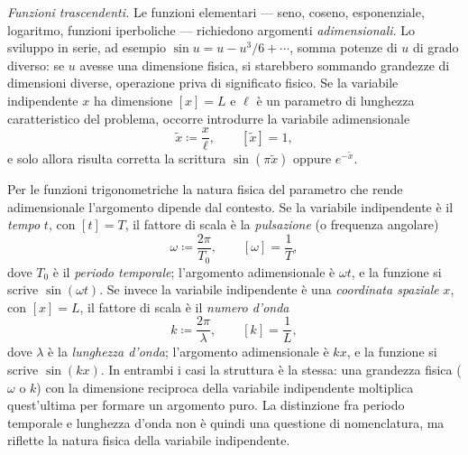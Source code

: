 \textit{Funzioni trascendenti.}
Le funzioni elementari --- seno, coseno, esponenziale, logaritmo, funzioni
iperboliche --- richiedono argomenti \emph{adimensionali}. Lo sviluppo in
serie, ad esempio $\sin u = u - u^3/6 + \cdots$, somma potenze di $u$ di
grado diverso: se $u$ avesse una dimensione fisica, si starebbero sommando
grandezze di dimensioni diverse, operazione priva di significato fisico.
Se la variabile indipendente $x$ ha dimensione $[x] = L$ e $\ell$
è un parametro di lunghezza caratteristico del problema, occorre introdurre
la variabile adimensionale
\begin{equation}
	\tilde{x} \coloneqq \frac{x}{\ell}, \qquad [\tilde{x}] = 1,
\end{equation}
e solo allora risulta corretta la scrittura $\sin(\pi\tilde{x})$ oppure
$e^{-\tilde{x}}$.

Per le funzioni trigonometriche la natura fisica del parametro che rende
adimensionale l'argomento dipende dal contesto. Se la variabile
indipendente è il \emph{tempo} $t$, con $[t] = T$, il fattore
di scala è la \emph{pulsazione} (o frequenza angolare)
\begin{equation}
	\omega \coloneqq \frac{2\pi}{T_0}, \qquad [\omega] = \frac{1}{T},
\end{equation}
dove $T_0$ è il \emph{periodo temporale}; l'argomento adimensionale è
$\omega t$, e la funzione si scrive $\sin(\omega t)$.
Se invece la variabile indipendente è una \emph{coordinata spaziale} $x$,
con $[x] = L$, il fattore di scala è il \emph{numero d'onda}
\begin{equation}
	k \coloneqq \frac{2\pi}{\lambda}, \qquad [k] = \frac{1}{L},
\end{equation}
dove $\lambda$ è la \emph{lunghezza d'onda}; l'argomento adimensionale è
$kx$, e la funzione si scrive $\sin(kx)$.
In entrambi i casi la struttura è la stessa: una grandezza fisica
($\omega$ o $k$) con la dimensione reciproca della variabile indipendente
moltiplica quest'ultima per formare un argomento puro. La distinzione fra
periodo temporale e lunghezza d'onda non è quindi una questione di
nomenclatura, ma riflette la natura fisica della variabile indipendente.

